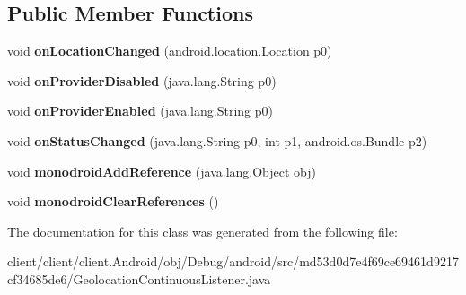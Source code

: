 \subsection*{Public Member Functions}
\begin{DoxyCompactItemize}
\item 
\hypertarget{classmd53d0d7e4f69ce69461d9217cf34685de6_1_1GeolocationContinuousListener_a028db096d9e2babdf4ea2a4427b49d8f}{}void {\bfseries on\+Location\+Changed} (android.\+location.\+Location p0)\label{classmd53d0d7e4f69ce69461d9217cf34685de6_1_1GeolocationContinuousListener_a028db096d9e2babdf4ea2a4427b49d8f}

\item 
\hypertarget{classmd53d0d7e4f69ce69461d9217cf34685de6_1_1GeolocationContinuousListener_ae8f632e57a70ded520040f05da574a60}{}void {\bfseries on\+Provider\+Disabled} (java.\+lang.\+String p0)\label{classmd53d0d7e4f69ce69461d9217cf34685de6_1_1GeolocationContinuousListener_ae8f632e57a70ded520040f05da574a60}

\item 
\hypertarget{classmd53d0d7e4f69ce69461d9217cf34685de6_1_1GeolocationContinuousListener_acff793155301c5bf97143c6386f29ec7}{}void {\bfseries on\+Provider\+Enabled} (java.\+lang.\+String p0)\label{classmd53d0d7e4f69ce69461d9217cf34685de6_1_1GeolocationContinuousListener_acff793155301c5bf97143c6386f29ec7}

\item 
\hypertarget{classmd53d0d7e4f69ce69461d9217cf34685de6_1_1GeolocationContinuousListener_ad3a5f82e2384522428a0177e08c7e3ac}{}void {\bfseries on\+Status\+Changed} (java.\+lang.\+String p0, int p1, android.\+os.\+Bundle p2)\label{classmd53d0d7e4f69ce69461d9217cf34685de6_1_1GeolocationContinuousListener_ad3a5f82e2384522428a0177e08c7e3ac}

\item 
\hypertarget{classmd53d0d7e4f69ce69461d9217cf34685de6_1_1GeolocationContinuousListener_aa2d3c67ee0cc2429a4a5cdfe91af6adb}{}void {\bfseries monodroid\+Add\+Reference} (java.\+lang.\+Object obj)\label{classmd53d0d7e4f69ce69461d9217cf34685de6_1_1GeolocationContinuousListener_aa2d3c67ee0cc2429a4a5cdfe91af6adb}

\item 
\hypertarget{classmd53d0d7e4f69ce69461d9217cf34685de6_1_1GeolocationContinuousListener_a3c7966484ad72d218e01ef25c4b412a8}{}void {\bfseries monodroid\+Clear\+References} ()\label{classmd53d0d7e4f69ce69461d9217cf34685de6_1_1GeolocationContinuousListener_a3c7966484ad72d218e01ef25c4b412a8}

\end{DoxyCompactItemize}


The documentation for this class was generated from the following file\+:\begin{DoxyCompactItemize}
\item 
client/client/client.\+Android/obj/\+Debug/android/src/md53d0d7e4f69ce69461d9217cf34685de6/Geolocation\+Continuous\+Listener.\+java\end{DoxyCompactItemize}
